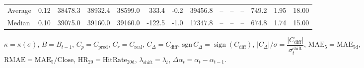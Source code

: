 \begin{threeparttable}
{\begin{tabular}{lrrrrrrrrrrrrr}
Average & 0.12 & 38478.3 & 38932.4 & 38599.0 & 333.4 & -0.2 & 39456.8 & -- & -- & -- & 749.2 & 1.95 & 18.00 \\
Median & 0.10 & 39075.0 & 39160.0 & 39160.0 & -122.5 & -1.0 & 17347.8 & -- & -- & -- & 674.8 & 1.74 & 15.00 \\
\bottomrule
\end{tabular}
}%
\begin{tablenotes}\footnotesize
\item $\kappa=\kappa(\sigma)$, $B=B_{t-1}$, $C_p=C_{\text{pred}}$, $C_r=C_{\text{real}}$, $C_\Delta=C_{\text{diff}}$, $\mathrm{sgn}\,C_\Delta=\operatorname{sign}(C_{\text{diff}})$, $|C_\Delta|/\sigma=\dfrac{|C_{\text{diff}}|}{\sigma_t^{\text{shift}}}$, $\mathrm{MAE}_5=\mathrm{MAE}_{5\text{d}}$, $\mathrm{RMAE}= \mathrm{MAE}_5 / \text{Close}$, $\mathrm{HR}_{20}=\mathrm{HitRate}_{20\text{d}}$, 
$\lambda_{\text{shift}}=\lambda_t$, 
$\Delta\alpha_t=\alpha_t-\alpha_{t-1}$.
\end{tablenotes}
\end{threeparttable}
\endgroup

